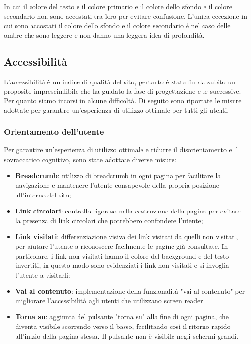 In cui il colore del testo e il colore primario e il colore dello sfondo e il
colore secondario non sono accostati tra loro per evitare confusione. L'unica
eccezione in cui sono accostati il colore dello sfondo e il colore secondario è
nel caso delle ombre che sono leggere e non danno una leggera idea di
profondità.

\subsection{Accessibilità}

L'accessibilità è un indice di qualità del sito, pertanto è stata fin da subito
un proposito imprescindibile che ha guidato la fase di progettazione e le
successive. Per quanto siamo incorsi in alcune difficoltà. Di seguito sono
riportate le misure adottate per garantire un'esperienza di utilizzo ottimale
per tutti gli utenti.

\subsubsection{Orientamento dell'utente}

Per garantire un'esperienza di utilizzo ottimale e ridurre il disorientamento e
il sovraccarico cognitivo, sono state adottate diverse misure:

\begin{itemize}
	\item \textbf{Breadcrumb}: utilizzo di breadcrumb in ogni pagina per
	      facilitare la navigazione e mantenere l'utente consapevole della
	      propria posizione all'interno del sito;

	\item \textbf{Link circolari}: controllo rigoroso nella costruzione della
	      pagina per evitare la presenza di link circolari che potrebbero
	      confondere l'utente;

	\item \textbf{Link visitati}: differenziazione visiva dei link visitati da
	      quelli non visitati, per aiutare l'utente a riconoscere facilmente le
	      pagine già consultate. In particolare, i link non visitati hanno il
	      colore del background e del testo invertiti, in questo modo sono
	      evidenziati i link non visitati e si invoglia l'utente a visitarli;

	\item \textbf{Vai al contenuto}: implementazione della funzionalità "vai al
	      contenuto" per migliorare l'accessibilità agli utenti che utilizzano
	      screen reader;

	\item \textbf{Torna su}: aggiunta del pulsante "torna su" alla fine di
	      ogni pagina, che diventa visibile scorrendo verso il basso,
	      facilitando così il ritorno rapido all'inizio della pagina stessa.
	      Il pulsante non è visibile negli schermi grandi.
\end{itemize}


